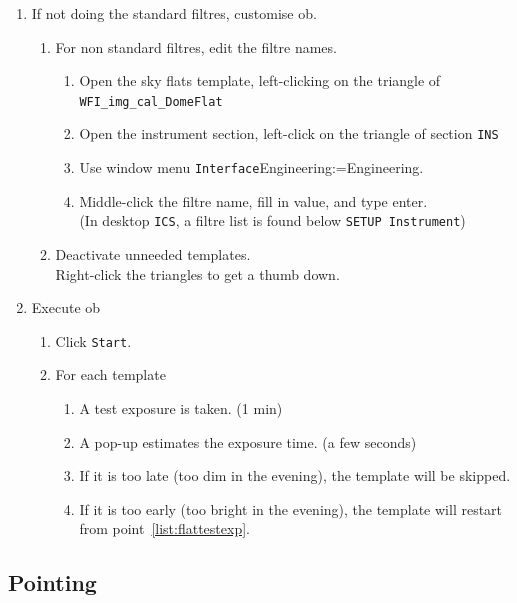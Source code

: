 \documentclass[11pt,fleqn,a4paper]{book}
\makeatletter
\def\menu#1#2{\texttt{#1}\ifx{}#2\else\@for\@x:=#2\do{$\rightarrow$\texttt{\@x}}\fi}
\def\wmenu#1#2{window menu \menu{#1}{#2}}
\makeatother
\begin{document}
\begin{enumerate}
\begin{itemize}
    \end{itemize}
  \item If not doing the standard filtres, customise \gls{ob}.
    \begin{enumerate}
       \item For non standard filtres, edit the filtre names.
             \label{list:editfilt} 
              \begin{enumerate}
                 \item Open the \gls{sky flats} \gls{template}, left-clicking on the triangle of \texttt{WFI\_img\_cal\_DomeFlat}
                 \item Open the instrument section, left-click on the triangle of section \texttt{INS}
                 \item Use \wmenu{Interface}{Engineering}.
                 \item Middle-click the filtre name, fill in value, and type enter.\\
                      (In \gls{desktop} \texttt{ICS}, a filtre list is found below \texttt{SETUP Instrument})
              \end{enumerate}
       \item Deactivate unneeded \gls{template}s.\\
             Right-click the triangles to get a thumb down.
    \end{enumerate}
  \item Execute \gls{ob}
    \begin{enumerate}
      \item Click \texttt{Start}.
      \item For each \gls{template}
       \begin{enumerate}
         \item \label{list:flattestexp}A test exposure is taken. (1 min)
         \item A pop-up estimates the exposure time. (a few seconds)
         \item If it is too late (too dim in the evening), the \gls{template} will be skipped.
         \item If it is too early (too bright in the evening), the \gls{template} will restart from point~\ref{list:flattestexp}.
       \end{enumerate}
    \end{enumerate}
\end{enumerate}


\subsection{Pointing} 
\end{document}
